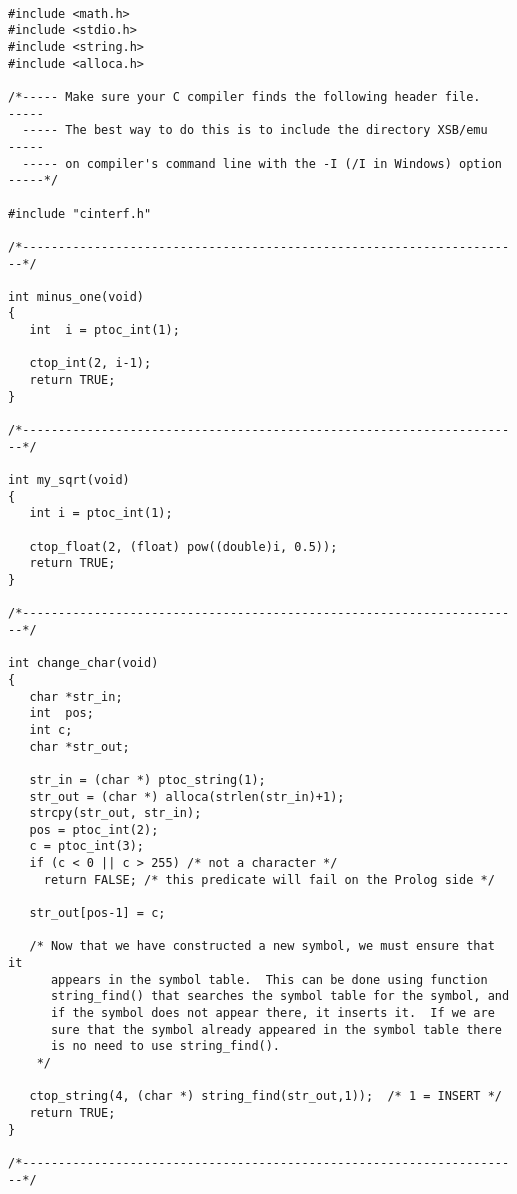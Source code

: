 \begin{small}
\begin{verbatim}

#include <math.h>
#include <stdio.h>
#include <string.h>
#include <alloca.h>

/*----- Make sure your C compiler finds the following header file.    -----
  ----- The best way to do this is to include the directory XSB/emu   -----
  ----- on compiler's command line with the -I (/I in Windows) option -----*/

#include "cinterf.h"

/*----------------------------------------------------------------------*/

int minus_one(void)
{
   int  i = ptoc_int(1);

   ctop_int(2, i-1);
   return TRUE;
}

/*----------------------------------------------------------------------*/

int my_sqrt(void)
{
   int i = ptoc_int(1);

   ctop_float(2, (float) pow((double)i, 0.5));
   return TRUE;
}

/*----------------------------------------------------------------------*/

int change_char(void)
{
   char *str_in;
   int  pos;
   int c;
   char *str_out;

   str_in = (char *) ptoc_string(1);
   str_out = (char *) alloca(strlen(str_in)+1);
   strcpy(str_out, str_in);
   pos = ptoc_int(2);
   c = ptoc_int(3);
   if (c < 0 || c > 255) /* not a character */
     return FALSE; /* this predicate will fail on the Prolog side */

   str_out[pos-1] = c;

   /* Now that we have constructed a new symbol, we must ensure that it
      appears in the symbol table.  This can be done using function
      string_find() that searches the symbol table for the symbol, and
      if the symbol does not appear there, it inserts it.  If we are
      sure that the symbol already appeared in the symbol table there
      is no need to use string_find().
    */

   ctop_string(4, (char *) string_find(str_out,1));  /* 1 = INSERT */
   return TRUE;
}

/*----------------------------------------------------------------------*/
\end{verbatim}
\end{small}

